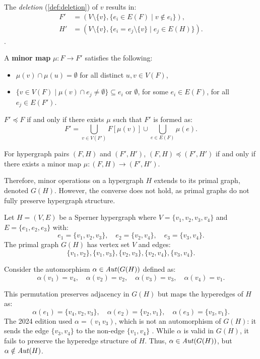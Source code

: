 The \emph{deletion} (\ref{def:deletion}) of $v$ results in:
\begin{align*}
F'&=\left(V\setminus\{v\},\{e_i\in E(F)\mid v\notin e_i\}\right),\\
H'&=\left(V\setminus\{v\},\{e_i=e_j\setminus\{v\}\mid e_j\in E(H)\}\right).
\end{align*}
\cite{BS15}.

A \textbf{minor map} $\mu:F\to F'$ satisfies the following:
\begin{itemize}
\item $\mu(v)\cap\mu(u)=\emptyset$ for all distinct $u,v\in V(F)$,
\item $\{v\in V(F)\mid\mu(v)\cap e_j\neq\emptyset\}\subseteq e_i$ or $\emptyset$, for some $e_i\in E(F)$, for all $e_j\in E(F')$.
\end{itemize}

$F'\preceq F$ if and only if there exists $\mu$ such that $F'$ is formed as:
\[
F'=\bigcup_{v\in V(F')}F[\mu(v)]\cup\bigcup_{e\in E(F)}\mu(e).
\]

For hypergraph pairs $(F,H)$ and $(F',H')$, $(F,H)\preceq(F',H')$ if and only if there exists a minor map $\mu:(F,H)\to(F',H')$.

Therefore, minor operations on a hypergraph $H$ extends to its primal graph, denoted $G(H)$. However, the converse does not hold, as primal graphs do not fully preserve hypergraph structure.

\begin{example}
Let $H=(V,E)$ be a Sperner hypergraph where $V=\{v_1,v_2,v_3,v_4\}$ and $E=\{e_1,e_2,e_3\}$ with:
\[
e_1=\{v_1,v_2,v_3\},\quad e_2=\{v_2,v_4\},\quad e_3=\{v_3,v_4\}.
\]
The primal graph $G(H)$ has vertex set $V$ and edges:
\[
\{v_1,v_2\},\{v_1,v_3\},\{v_2,v_3\},\{v_2,v_4\},\{v_3,v_4\}.
\]

Consider the automorphism $\alpha\in\mathit{Aut}(G(H))$ defined as:
\[
\alpha(v_1)=v_4,\quad\alpha(v_2)=v_2,\quad\alpha(v_3)=v_3,\quad\alpha(v_4)=v_1.
\]

This permutation preserves adjacency in $G(H)$ but maps the hyperedges of $H$ as:
\[
\alpha(e_1)=\{v_4,v_2,v_3\},\quad\alpha(e_2)=\{v_2,v_1\},\quad\alpha(e_3)=\{v_3,v_1\}.
\]
The 2024 edition used $\alpha=(v_1\,v_3)$, which is not an automorphism of $G(H)$: it sends the edge $\{v_3,v_4\}$ to the non-edge $\{v_1,v_4\}$ .
While $\alpha$ is valid in $G(H)$, it fails to preserve the hyperedge structure of $H$. Thus, $\alpha\in\mathit{Aut}(G(H))$, but $\alpha\notin\mathit{Aut}(H)$.
\end{example}

